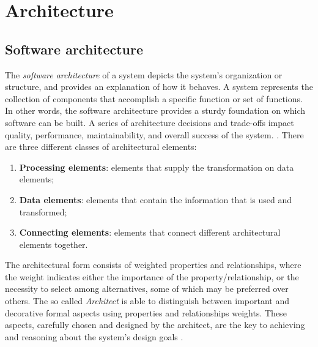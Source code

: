 \documentclass[\main/main.tex]{subfiles}
\begin{document}
\chapter{Architecture}

\section{Software architecture}
The \emph{software architecture} of a system depicts the system’s organization or structure, and provides an explanation of how it behaves. A system represents the collection of components that accomplish a specific function or set of functions. In other words, the software architecture provides a sturdy foundation on which software can be built. A series of architecture decisions and trade-offs impact quality, performance, maintainability, and overall success of the system. \cite{Perry1992FoundationsFT} \cite{sw_arch_synopsys}. There are three different classes of architectural elements: 
\begin{enumerate}
    \item \textbf{Processing elements}: elements that supply the transformation on data elements;
    \item \textbf{Data elements}: elements that contain the information that is used and transformed;
    \item \textbf{Connecting elements}: elements that connect different architectural elements together.
\end{enumerate}
The architectural form consists of weighted properties and relationships, where the weight indicates either the importance of the property/relationship, or the necessity to select among alternatives, some of which may be preferred over others. The so called \emph{Architect} is able to distinguish between important and decorative formal aspects using properties and relationships weights. These aspects, carefully chosen and designed by the architect, are the key to achieving and reasoning about the system’s design goals \cite{sw_arch_def_carnegie}. 
\end{document}
